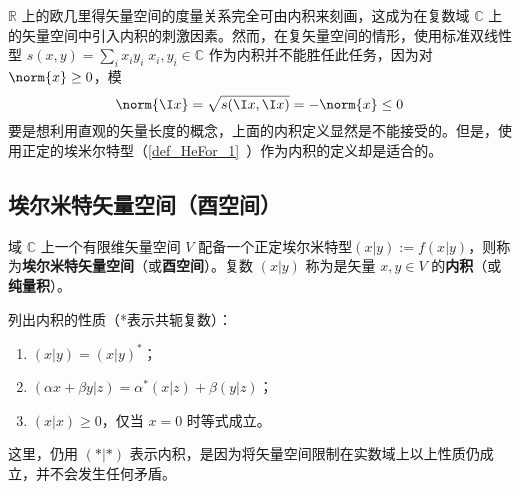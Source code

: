 
\begin{issues}
\issueTODO
\end{issues}

$\mathbb{R}$ 上的欧几里得矢量空间的度量关系完全可由内积来刻画，这成为在复数域 $\mathbb{C}$ 上的矢量空间中引入内积的刺激因素。然而，在复矢量空间的情形，使用标准双线性型 $s( x, y)=\sum_{i}x_iy_i\;x_i,y_i\in\mathbb{C}$ 作为内积并不能胜任此任务，因为对 $\norm{x}\geq0$，模
\begin{equation}
\norm{\I x}=\sqrt{s(\I x,\I x)}=-\norm{ x}\leq0
\end{equation}
要是想利用直观的矢量长度的概念，上面的内积定义显然是不能接受的。但是，使用正定的埃米尔特型（\autoref{def_HeFor_1}~）作为内积的定义却是适合的。
\subsection{埃尔米特矢量空间（酉空间）}
\begin{definition}{}\label{def_HVorUV_1}
域 $\mathbb{C}$ 上一个有限维矢量空间 $V$ 配备一个正定埃尔米特型$( x|  y):=f(  x|  y)$，则称为\textbf{埃尔米特矢量空间}（或\textbf{酉空间}）。复数 $(  x|  y)$ 称为是矢量 $  x,  y\in V$ 的\textbf{内积}（或\textbf{纯量积}）。
\end{definition}
列出内积的性质（*表示共轭复数）：
\begin{enumerate}
\item $(  x|  y)=(  x|  y)^*$；
\item $(\alpha  x+\beta  y|  z)=\alpha^*(  x|  z)+\beta(  y|  z)$；
\item $(  x|  x)\geq0$，仅当 $  x=  0$ 时等式成立。
\end{enumerate}

这里，仍用 $(*|*)$ 表示内积，是因为将矢量空间限制在实数域上以上性质仍成立，并不会发生任何矛盾。

